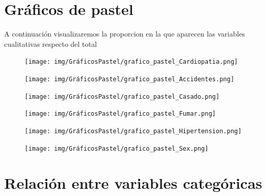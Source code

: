 \documentclass[a4paper, 12pt]{article}
\begin{document}
\newpage
\section{Gráficos de pastel}
A continuación visualizaremos la proporcion en la que aparecen las variables cualitativas respecto del total

\begin{figure}[H]
    \centering
    \begin{minipage}{0.45\textwidth}
        \centering
        \texttt{[image: img/GráficosPastel/grafico\_pastel\_Cardiopatia.png]}
    \end{minipage}
    \begin{minipage}{0.45\textwidth}
        \centering
        \texttt{[image: img/GráficosPastel/grafico\_pastel\_Accidentes.png]}
    \end{minipage}
    \vfill
    \begin{minipage}{0.45\textwidth}
        \centering
        \texttt{[image: img/GráficosPastel/grafico\_pastel\_Casado.png]}
    \end{minipage}
    \begin{minipage}{0.45\textwidth}
        \centering
        \texttt{[image: img/GráficosPastel/grafico\_pastel\_Fumar.png]}
    \end{minipage}
    \vfill
    \begin{minipage}{0.45\textwidth}
        \centering
        \texttt{[image: img/GráficosPastel/grafico\_pastel\_Hipertension.png]}
    \end{minipage}
    \begin{minipage}{0.45\textwidth}
        \centering
        \texttt{[image: img/GráficosPastel/grafico\_pastel\_Sex.png]}
    \end{minipage}
    \vfill
\end{figure}

\newpage

\section{Relación entre variables categóricas}
\end{document}
